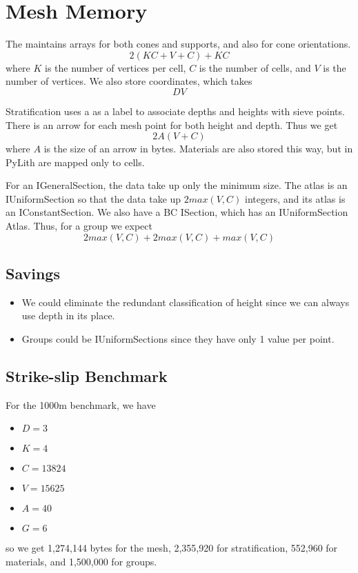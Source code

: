 \section{Mesh Memory}

    The  maintains arrays for both cones and supports, and also for cone orientations.
$$
  2 (K C + V+C) + K C
$$
where $K$ is the number of vertices per cell, $C$ is the number of cells, and $V$ is the number of vertices. We also
store coordinates, which takes
$$
  D V
$$

    Stratification uses a  as a label to associate depths and heights with sieve points. There is an arrow
for each mesh point for both height and depth. Thus we get
$$
  2 A (V + C)
$$
where $A$ is the size of an arrow in bytes. Materials are also stored this way, but in PyLith are mapped only to cells.

    For an IGeneralSection, the data take up only the minimum size. The atlas is an IUniformSection so that the data
take up $2 max(V, C)$ integers, and its atlas is an IConstantSection. We also have a BC ISection, which has an
IUniformSection Atlas. Thus, for a group we expect
$$
  2 max(V, C) + 2 max(V, C) + max(V, C)
$$

\subsection{Savings}

\begin{itemize}
  \item We could eliminate the redundant classification of height since we can always use depth in its place.

  \item Groups could be IUniformSections since they have only 1 value per point.
\end{itemize}

\subsection{Strike-slip Benchmark}
    For the 1000m benchmark, we have
\begin{itemize}
  \item $D = 3$
  \item $K = 4$
  \item $C = 13824$
  \item $V = 15625$
  \item $A = 40$
  \item $G = 6$
\end{itemize}
so we get 1,274,144 bytes for the mesh, 2,355,920 for stratification, 552,960 for materials, and 1,500,000 for groups.